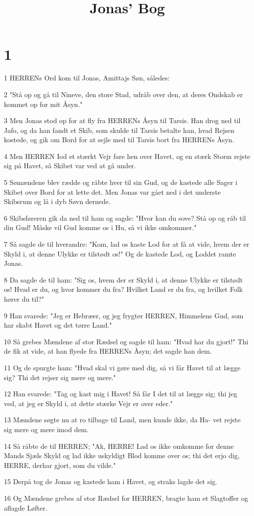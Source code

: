 

\title{Jonas' Bog}


\chapter{1}

\par 1 HERRENs Ord kom til Jonas, Amittajs Søn, således:
\par 2 "Stå op og gå til Nineve, den store Stad, udråb over den, at deres Ondskab er kommet op for mit Åsyn."
\par 3 Men Jonas stod op for at fly fra HERRENs Åsyn til Tarsis. Han drog ned til Jafo, og da han fandt et Skib, som skulde til Tarsis betalte han, hvad Rejsen kostede, og gik om Bord for at sejle med til Tarsis bort fra HERRENs Åsyn.
\par 4 Men HERREN Iod et stærkt Vejr fare hen over Havet, og en stærk Storm rejste sig på Havet, så Skibet var ved at gå under.
\par 5 Sømændene blev rædde og råbte hver til sin Gud, og de kastede alle Sager i Skibet over Bord for at lette det. Men Jonas var gået ned i det underste Skibsrum og lå i dyb Søvn dernede.
\par 6 Skibsføreren gik da ned til ham og sagde: "Hvor kan du sove? Stå op og råb til din Gud! Måske vil Gud komme os i Hu, så vi ikke omkommer."
\par 7 Så sagde de til hverandre: "Kom, lad os kaste Lod for at få at vide, hvem der er Skyld i, at denne Ulykke er tilstødt os!" Og de kastede Lod, og Loddet ramte Jonas.
\par 8 Da sagde de til ham: "Sig os, hvem der er Skyld i, at denne Ulykke er tilstødt os! Hvad er du, og hvor kommer du fra? Hvilket Land er du fra, og hvilket Folk hører du til?"
\par 9 Han svarede: "Jeg er Hebræer, og jeg frygter HERREN, Himmelens Gud, som har skabt Havet og det tørre Land."
\par 10 Så grebes Mændene af stor Rædsel og sagde til ham: "Hvad har du gjort!" Thi de fik at vide, at han flyede fra HERRENs Åsyn; det sagde han dem.
\par 11 Og de spurgte ham: "Hvad skal vi gøre med dig, så vi får Havet til at lægge sig? Thi det rejser sig mere og mere."
\par 12 Han svarede: "Tag og kast mig i Havet! Så får I det til at lægge sig; thi jeg ved, at jeg er Skyld i, at dette stærke Vejr er over eder."
\par 13 Mændene søgte nu at ro tilbage til Land, men kunde ikke, da Ha- vet rejste sig mere og mere imod dem.
\par 14 Så råbte de til HERREN; "Ak, HERRE! Lad os ikke omkomme for denne Mands Sjæls Skyld og lad ikke uskyldigt Blod komme over os; thi det erjo dig, HERRE, derhar gjort, som du vilde."
\par 15 Derpå tog de Jonas og kastede ham i Havet, og straks lagde det sig.
\par 16 Og Mændene grebes af stor Rædsel for HERREN, bragte ham et Slagtoffer og aflagde Løfter.

